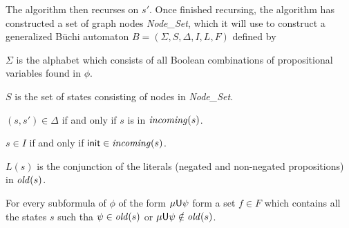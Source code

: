 The algorithm then recurses on $s'$.
Once finished recursing, the algorithm has constructed a set of graph nodes {\it Node\_Set}, which it will use to construct a generalized B\"uchi automaton $B=(\Sigma,S,\Delta,I,L,F)$ defined by
\benum
    \item $\Sigma$ is the alphabet which consists of all Boolean combinations of propositional variables found in $\phi$.
    \item $S$ is the set of states consisting of nodes in {\it Node\_Set}.
    \item $(s,s')\in\Delta$ if and only if $s$ is in ${\it incoming}(s)$.
    \item $s\in I$ if and only if ${\sf init}\in{\it incoming}(s)$.
    \item $L(s)$ is the conjunction of the literals (negated and non-negated propositions) in ${\it old}(s)$.
    \item For every subformula of $\phi$ of the form $\mu{\sf U}\psi$ form a set $f\in F$ which contains all the states $s$ such tha $\psi\in{\it old}(s)$ or $\mu{\sf U}\psi\notin{\it old}(s)$.
\eenum

\bye

